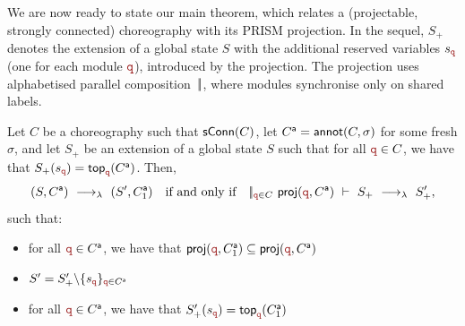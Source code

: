 We are now ready to state our main theorem, which relates a
(projectable, strongly connected) choreography with its PRISM
projection.  In the sequel, $S_+$ denotes the extension of a global
state $S$ with the additional reserved variables $s_{\nrr}$ (one for
each module $\nrr$), introduced by the projection.  The projection
uses alphabetised parallel composition~$|\!|$, where modules
synchronise only on shared labels.
%
\begin{theorem}[Projection]\label{thm:epp}
  Let $C$ be a choreography such that $\mathsf{sConn}(C)$, let
  ${C}^{\mathsf a} = \mathsf{annot}(C,\sigma)$ for some fresh $\sigma$, and
  let $S_+$ be an extension of a global state $S$ such that for all
  $\nrr\in C$, we have that
  $S_+(s_{\nrr})=\topannotation\nrr {\anno C}$.  Then,
  \[
    (S, \anno C) \red{\lambda} (S', \anno {C}_1) \quad\text{if and only if}\quad
    \pp_{\nrr\in C}\ \proj(\nrr, \anno C)\ \vdash\ S_+ \red{\lambda}
    S_+' ,
  \]
  such that: 
  \begin{itemize}
  \item for all $\nrr\in \anno C$, we have that
    $\proj(\nrr, \anno C_1) \subseteq \proj(\nrr, \anno C)$
  \item $S'=S'_{+}\backslash \{s_{\nrr}\}_{\nrr\in \anno C}$
  \item for all $\nrr\in \anno C$, we have that
    $S_+'(s_{\nrr}) = \topannotation\nrr {\anno C_1}$
  \end{itemize}
\end{theorem}
%
%
